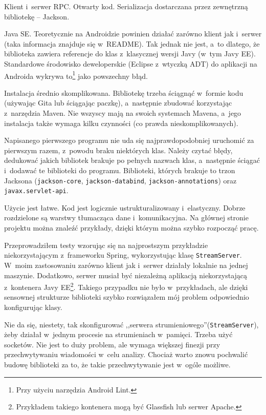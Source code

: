 \begin{description}
Klient i~serwer RPC. Otwarty kod. Serializacja dostarczana przez zewnętrzną bibliotekę -- Jackson.

Java SE.
Teoretycznie na Androidzie powinien działać zarówno klient jak i~serwer (taka informacja znajduje się w~README).
Tak jednak nie jest, a~to dlatego, że biblioteka zawiera referencje do klas z~klasycznej wersji Javy (w~tym Javy EE).
Standardowe środowisko deweloperskie (Eclipse z~wtyczką ADT) do aplikacji na Androida wykrywa to\footnote{Przy użyciu narzędzia Android Lint.} jako powszechny błąd.

Instalacja średnio skomplikowana.
Bibliotekę trzeba ściągnąć w~formie kodu (używając Gita lub ściągając paczkę), a~następnie zbudować korzystając z~narzędzia Maven.
Nie wszyscy mają na swoich systemach Mavena, a~jego instalacja także wymaga kilku czynności (co prawda nieskomplikowanych).

Napisanego pierwszego programu nie uda się najprawdopodobniej uruchomić za pierwszym razem, z~powodu braku niektórych klas.
Należy czytać błędy, dedukować jakich bibliotek brakuje po pełnych nazwach klas, a~następnie ściągać i~dodawać te biblioteki do programu.
Biblioteki, których brakuje to trzon Jacksona (\texttt{jackson-core}, \texttt{jackson-databind}, \texttt{jackson-annotations}) oraz \texttt{javax.servlet-api}.

Użycie jest łatwe. Kod jest logicznie ustrukturalizowany i~elastyczny.
Dobrze rozdzielone są warstwy tłumacząca dane i~komunikacyjna.
Na głównej stronie projektu można znaleźć przykłady, dzięki którym można szybko rozpocząć pracę.

Przeprowadziłem testy wzorując się na najprostszym przykładzie niekorzystającym z~frameworku Spring, wykorzystując klasę \texttt{StreamServer}.
W~moim zastosowaniu zarówno klient jak i~serwer działały lokalnie na jednej maszynie. Dodatkowo, serwer musiał być niezależną aplikacją niekorzystającą z~kontenera Javy EE\footnote{Przykładem takiego kontenera mogą być Glassfish lub serwer Apache.}.
Takiego przypadku nie było w~przykładach, ale dzięki sensownej strukturze biblioteki szybko rozwiązałem mój problem odpowiednio konfigurując klasy.

Nie da się, niestety, tak skonfigurować ,,serwera strumieniowego''(\texttt{StreamServer}), żeby działał w~jednym procesie na strumieniach w~pamięci. Trzeba użyć socketów. Nie jest to duży problem, ale wymaga większej finezji przy przechwytywaniu wiadomości w~celu analizy. Chociaż warto znowu pochwalić budowę biblioteki za to, że takie przechwytywanie jest w~ogóle możliwe.


\end{description}
